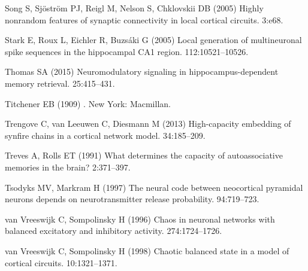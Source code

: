 \begin{thebibliography}{}
Song S, Sj\"{o}str\"{o}m PJ, Reigl M, Nelson S, Chklovskii DB (2005{\rm{}})
\newblock Highly nonrandom features of synaptic connectivity in local cortical
  circuits.
 3:e68.

Stark E, Roux L, Eichler R, Buzs\'{a}ki G (2005{\rm{}})
\newblock Local generation of multineuronal spike sequences in
the hippocampal CA1 region.
 112:10521--10526.


Thomas SA (2015{\rm{}})
\newblock Neuromodulatory signaling in hippocampus-dependent memory retrieval.
 25:415--431.

Titchener EB (1909{\rm{}})
.
\newblock New York: Macmillan.

Trengove C, van Leeuwen C, Diesmann M (2013{\rm{}})
\newblock High-capacity embedding of synfire chains in a cortical network
  model.
 34:185--209.

Treves A, Rolls ET (1991{\rm{}})
\newblock What determines the capacity of autoassociative memories in the brain?
 2:371--397.

Tsodyks MV, Markram H (1997{\rm{}})
\newblock The neural code between neocortical pyramidal neurons depends on neurotransmitter release probability.
 94:719--723.

van Vreeswijk C, Sompolinsky H (1996{\rm{}})
\newblock Chaos in neuronal networks with balanced excitatory and inhibitory
  activity.
 274:1724--1726.

van Vreeswijk C, Sompolinsky H (1998{\rm{}})
\newblock Chaotic balanced state in a model of cortical circuits.
 10:1321--1371.



\end{thebibliography}
